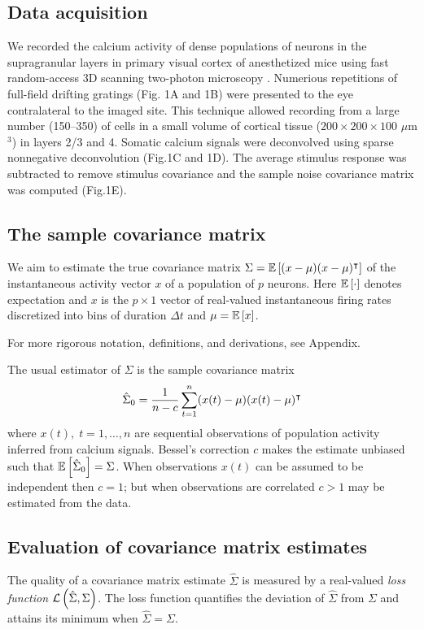 \subsection*{Data acquisition}
We recorded the calcium activity  of dense populations of neurons in the supragranular layers in primary visual cortex of anesthetized mice using fast random-access 3D scanning two-photon microscopy \cite{Stosiek:2003,Reddy:2005}.  Numerious repetitions of full-field drifting gratings (Fig. 1A and 1B) were presented to the eye contralateral to the imaged site. This technique allowed recording from a large number (150--350) of cells in a small volume of cortical tissue ($200\times200\times100$ $\mu$m$^3$) in layers 2/3 and 4. Somatic calcium signals were deconvolved using  sparse nonnegative deconvolution \cite{Vogelstein:2010} (Fig.\;1C and 1D).  The average stimulus response was subtracted to remove stimulus covariance and the sample noise covariance matrix was computed (Fig.\;1E).



\subsection*{The sample covariance matrix}
We aim to estimate the true covariance matrix $\Sigma = \mathbb E\left[ (x-\mu)(x-\mu)^\intercal\right]$ of the instantaneous activity vector $x$ of a population of $p$ neurons. Here $\mathbb E\left[ \cdot\right]$ denotes expectation  and $x$ is the $p\times 1$ vector of real-valued instantaneous firing rates discretized into bins of duration $\Delta t$ and $\mu = \mathbb E\left[ x\right]$.  

For more rigorous notation, definitions, and derivations, see Appendix. 

The usual estimator of $\Sigma$ is the sample covariance matrix
\begin{equation}
\hat \Sigma_0 = \frac 1 {n-c} \sum\limits_{t=1}^n (x(t)-\mu)(x(t)-\mu)^\intercal 
\end{equation}
where $x(t),\;t=1,\ldots,n$ are sequential observations of population activity inferred from calcium signals. Bessel's correction $c$ makes the estimate unbiased such that $\mathbb E\left[ \hat\Sigma_0\right] = \Sigma$. When observations $x(t)$ can be assumed to be independent then $c=1$; but when observations are correlated $c>1$ may be estimated from the data. 

\subsection*{Evaluation of covariance matrix estimates}
The quality of a covariance matrix estimate $\hat\Sigma$ is measured by a real-valued \emph{loss function} $\mathcal L\left(\hat\Sigma,\Sigma\right)$.  The loss function quantifies the deviation of $\hat\Sigma$ from $\Sigma$ and attains its minimum  when $\hat\Sigma = \Sigma$. 

